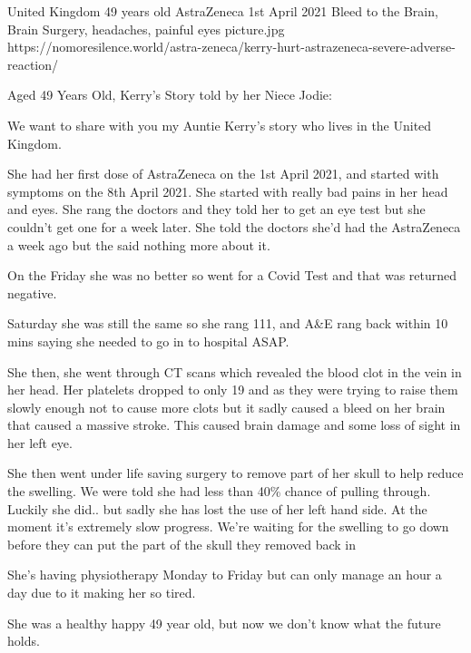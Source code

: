 {United Kingdom}
{49 years old}
{AstraZeneca}
{1st April 2021}
{Bleed to the Brain, Brain Surgery, headaches, painful eyes }
{picture.jpg}
{https://nomoresilence.world/astra-zeneca/kerry-hurt-astrazeneca-severe-adverse-reaction/}
{

Aged 49 Years Old, Kerry’s Story told by her Niece Jodie:

We want to share with you my Auntie Kerry’s story who lives in the United
Kingdom.

She had her first dose of AstraZeneca on the 1st April 2021, and started with
symptoms on the 8th April 2021. She started with really bad pains in her head
and eyes. She rang the doctors and they told her to get an eye test but she
couldn’t get one for a week later. She told the doctors she’d had the
AstraZeneca a week ago but the said nothing more about it.

On the Friday she was no better so went for a Covid Test and that was returned
negative.

Saturday she was still the same so she rang 111, and A\&E rang back within 10
mins saying she needed to go in to hospital ASAP.

She then, she went through CT scans which revealed the blood clot in the vein in
her head. Her platelets dropped to only 19 and as they were trying to raise them
slowly enough not to cause more clots but it sadly caused a bleed on her brain
that caused a massive stroke. This caused brain damage and some loss of sight in
her left eye.

She then went under life saving surgery to remove part of her skull to help
reduce the swelling. We were told she had less than 40\% chance of pulling
through. Luckily she did.. but sadly she has lost the use of her left hand side.
At the moment it’s extremely slow progress. We’re waiting for the swelling to go
down before they can put the part of the skull they removed back in

She’s having physiotherapy Monday to Friday but can only manage an hour a day
due to it making her so tired.

She was a healthy happy 49 year old, but now we don’t know what the future
holds.

}

